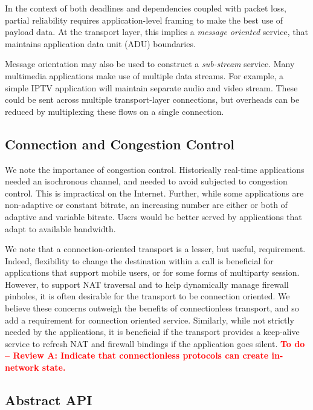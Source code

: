 \documentclass[10pt]{sig-alternate-05-2015}
\newcommand{\todo}[1]{\textbf{\textcolor{red}{To do -- #1}}}
\begin{document}
In the context of both deadlines and dependencies coupled with packet loss, partial reliability
requires application-level framing \cite{clark:1990:architecture} to
make the best use of payload data. At the transport
layer, this implies a \emph{message oriented} service, that
maintains application data unit (ADU) boundaries.

Message orientation may also be used to construct a \emph{sub-stream} service.
Many multimedia applications make use of multiple data streams. For example, a
simple IPTV application will maintain separate audio and video stream. These
could be sent across multiple transport-layer connections, but overheads can be
reduced by multiplexing these flows on a single connection.

\subsection{Connection and Congestion Control}

We note the importance of congestion control. %
Historically real-time applications needed an isochronous channel,
and needed to avoid subjected to congestion control. This is impractical on the
Internet. Further, while some applications are non-adaptive or constant bitrate,
an increasing number are either or both of adaptive and variable bitrate.
Users would be better served by applications that adapt to available bandwidth.

We note that a connection-oriented transport is a lesser, but useful,
requirement.
Indeed, flexibility to
change the destination within a call is beneficial for
applications that support mobile users, or for some forms of multiparty session.
However, to support NAT traversal and to help dynamically manage firewall
pinholes, it is often desirable for the transport to be connection oriented. We
believe these concerns outweigh the benefits of connectionless transport, and so
add a requirement for connection oriented service. Similarly, while not strictly
needed by the applications, it is beneficial if the transport provides a
keep-alive service to refresh NAT and firewall bindings if the application goes
silent.
\todo{Review A: Indicate that connectionless protocols can create in-network
state.}

\subsection{Abstract API}
\end{document}
